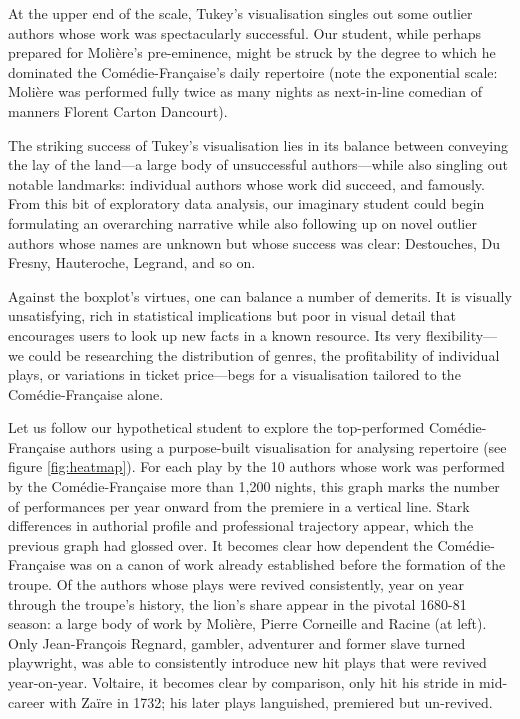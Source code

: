 \documentclass[	DIV=calc,%
							paper=a4,%
							fontsize=11pt,%
							twocolumn]{scrartcl}	 					%
\begin{document}
At the upper end of the scale, Tukey’s visualisation singles out some outlier authors whose work was spectacularly successful.  Our student, while perhaps prepared for Molière’s pre-eminence, might be struck by the degree to which he dominated the Comédie-Française’s daily repertoire (note the exponential scale: Molière was performed fully twice as many nights as next-in-line comedian of manners Florent Carton Dancourt).

The striking success of Tukey’s visualisation lies in its balance between conveying the lay of the land—a large body of unsuccessful authors—while also singling out notable landmarks: individual authors whose work did succeed, and famously.  From this bit of exploratory data analysis, our imaginary student could begin formulating an overarching narrative while also following up on novel outlier authors whose names are unknown but whose success was clear: Destouches, Du Fresny, Hauteroche, Legrand, and so on.

Against the boxplot’s virtues, one can balance a number of demerits.  It is visually unsatisfying, rich in statistical implications but poor in visual detail that encourages users to look up new facts in a known resource.  Its very flexibility—we could be researching the distribution of genres, the profitability of individual plays, or variations in ticket price—begs for a visualisation tailored to the Comédie-Française alone.

Let us follow our hypothetical student to explore the top-performed Comédie-Française authors using a purpose-built visualisation for analysing repertoire (see figure
\ref{fig:heatmap}).  For each play by the 10 authors whose work was performed by the Comédie-Française more than 1,200 nights, this graph marks the number of performances per year onward from the premiere in a vertical line.  Stark differences in authorial profile and professional trajectory appear, which the previous graph had glossed over.  It becomes clear how dependent the Comédie-Française was on a canon of work already established before the formation of the troupe.  Of the authors whose plays were revived consistently, year on year through the troupe’s history, the lion’s share appear in the pivotal 1680-81 season: a large body of work by Molière, Pierre Corneille and Racine (at left).  Only Jean-François Regnard, gambler, adventurer and former slave turned playwright, was able to consistently introduce new hit plays that were revived year-on-year.  Voltaire, it becomes clear by comparison, only hit his stride in mid-career with Zaïre in 1732; his later plays languished, premiered but un-revived.
\end{document}
